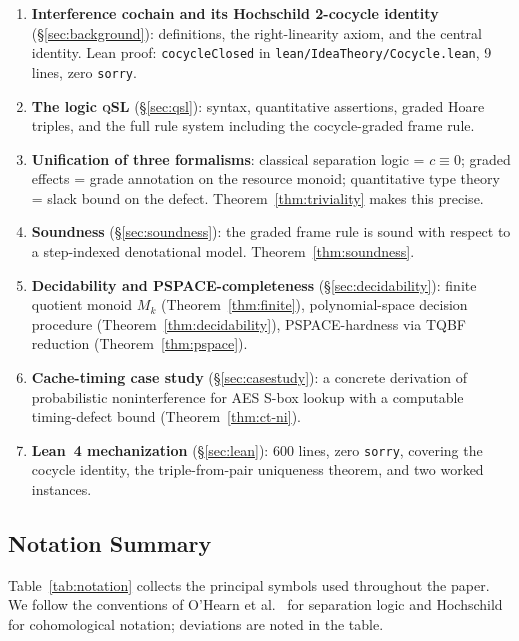 \documentclass[acmsmall,sigplan,anonymous,review,screen]{acmart}
\theoremstyle{plain}
\theoremstyle{definition}
\newcommand{\qSL}{\textsc{qSL}\xspace}
\newcommand{\lean}[1]{\texttt{#1}}
\begin{document}
\begin{enumerate}[label=(\arabic*),leftmargin=2em,itemsep=2pt]
  \item \textbf{Interference cochain and its Hochschild 2-cocycle identity}
    (\S\ref{sec:background}): definitions, the right-linearity axiom, and
    the central identity.  Lean proof: \lean{cocycleClosed} in
    \lean{lean/IdeaTheory/Cocycle.lean}, 9 lines, zero \lean{sorry}.

  \item \textbf{The logic \qSL} (\S\ref{sec:qsl}): syntax, quantitative
    assertions, graded Hoare triples, and the full rule system including
    the cocycle-graded frame rule.

  \item \textbf{Unification of three formalisms}: classical separation
    logic = $c \equiv 0$; graded effects = grade annotation on the resource
    monoid; quantitative type theory = slack bound on the defect.
    Theorem~\ref{thm:triviality} makes this precise.

  \item \textbf{Soundness} (\S\ref{sec:soundness}): the graded frame rule is
    sound with respect to a step-indexed denotational model.
    Theorem~\ref{thm:soundness}.

  \item \textbf{Decidability and PSPACE-completeness} (\S\ref{sec:decidability}):
    finite quotient monoid $M_k$ (Theorem~\ref{thm:finite}), polynomial-space
    decision procedure (Theorem~\ref{thm:decidability}), PSPACE-hardness via
    TQBF reduction (Theorem~\ref{thm:pspace}).

  \item \textbf{Cache-timing case study} (\S\ref{sec:casestudy}):
    a concrete derivation of probabilistic noninterference for AES
    S-box lookup with a computable timing-defect bound
    (Theorem~\ref{thm:ct-ni}).

  \item \textbf{Lean~4 mechanization} (\S\ref{sec:lean}): 600 lines, zero
    \lean{sorry}, covering the cocycle identity, the triple-from-pair
    uniqueness theorem, and two worked instances.
\end{enumerate}

\subsection{Notation Summary}
\label{sec:intro:notation}

Table~\ref{tab:notation} collects the principal symbols used throughout the
paper.  We follow the conventions of O'Hearn et al.~\cite{ohearn2001local}
for separation logic and Hochschild~\cite{hochschild1945cohomology} for
cohomological notation; deviations are noted in the table.
\end{document}
